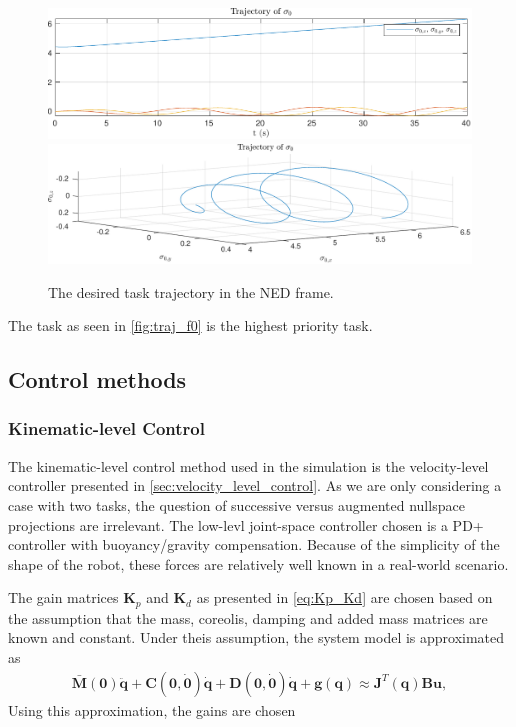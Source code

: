 \begin{figure}[h]
    \centering
    \includegraphics[width=\linewidth]{assets/plots/traj_xyz.pdf}
    \includegraphics[width=\linewidth]{assets/plots/traj_taskspace.pdf}
    \caption{The desired task trajectory in the NED frame.}
    \label{fig:traj_f0}
\end{figure}

The task as seen in \autoref{fig:traj_f0} is the highest priority task.


\subsection{Control methods}
\subsubsection{Kinematic-level Control}

The kinematic-level control method used in the simulation is the velocity-level
controller presented in \autoref{sec:velocity_level_control}. As we are only considering
a case with two tasks, the question of successive versus augmented nullspace projections
are irrelevant. The low-levl joint-space controller chosen is a PD+ controller
with buoyancy/gravity compensation. Because of the simplicity of the shape of the robot,
these forces are relatively well known in a real-world scenario.

The gain matrices $\bm{K}_p$ and $\bm{K}_d$ as presented in \autoref{eq:Kp_Kd}
are chosen based on the assumption that the mass, coreolis, damping and added mass
matrices are known and constant. Under theis assumption, the system model is approximated
as
\begin{align}
    \bar{\bm{M}}(\bm{0}) \ddot{\bm{q}} + \bm{C}(\bm{0}, \dot{\bm{0}}) \dot{\bm{q}} +
    \bm{D}(\bm{0}, \dot{\bm{0}}) \dot{\bm{q}} + \bm{g}(\bm{q}) \approx \bm{J}^T(\bm{q}) \bm{B} \bm{u},
\end{align}
Using this approximation, the gains are chosen 

